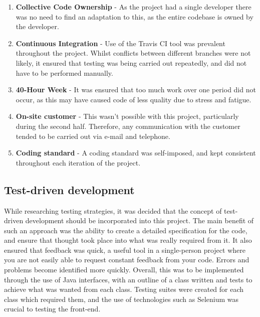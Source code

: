 \begin{enumerate}
\item	\textbf{Collective Code Ownership} - As the project had a single developer there was no need to find an adaptation to this, as the entire codebase is owned by the developer.
\item	\textbf{Continuous Integration} - Use of the Travis CI tool was prevalent throughout the project. Whilst conflicts between different branches were not likely, it ensured that testing was being carried out repeatedly, and did not have to be performed manually\cite{TravisCI}.
\item	\textbf{40-Hour Week} - It was ensured that too much work over one period did not occur, as this may have caused code of less quality due to stress and fatigue.
\item	\textbf{On-site customer} - This wasn't possible with this project, particularly during the second half. Therefore, any communication with the customer tended to be carried out via e-mail and telephone.
\item	\textbf{Coding standard} - A coding standard was self-imposed, and kept consistent throughout each iteration of the project.
\end{enumerate}
\subsection{Test-driven development}

While researching testing strategies, it was decided that the concept of test-driven development should be incorporated into this project. The main benefit of such an approach was the ability to create a detailed specification for the code, and ensure that thought took place into what was really required from it. It also ensured that feedback was quick, a useful tool in a single-person project where you are not easily able to request constant feedback from your code. Errors and problems become identified more quickly. Overall, this was to be implemented through the use of Java interfaces, with an outline of a class written and tests to achieve what was wanted from each class. Testing suites were created for each class which required them, and the use of technologies such as Selenium was crucial to testing the front-end.

